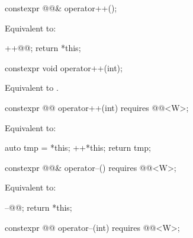 \begin{itemdecl}
constexpr @@& operator++();
\end{itemdecl}

\begin{itemdescr}
\pnum
\effects
Equivalent to:
\begin{codeblock}
++@@;
return *this;
\end{codeblock}
\end{itemdescr}

\begin{itemdecl}
constexpr void operator++(int);
\end{itemdecl}

\begin{itemdescr}
\pnum
\effects
Equivalent to .
\end{itemdescr}

\begin{itemdecl}
constexpr @@ operator++(int) requires @@<W>;
\end{itemdecl}

\begin{itemdescr}
\pnum
\effects
Equivalent to:
\begin{codeblock}
auto tmp = *this;
++*this;
return tmp;
\end{codeblock}
\end{itemdescr}

\begin{itemdecl}
constexpr @@& operator--() requires @@<W>;
\end{itemdecl}

\begin{itemdescr}
\pnum
\effects
Equivalent to:
\begin{codeblock}
--@@;
return *this;
\end{codeblock}
\end{itemdescr}

\begin{itemdecl}
constexpr @@ operator--(int) requires @@<W>;
\end{itemdecl}

